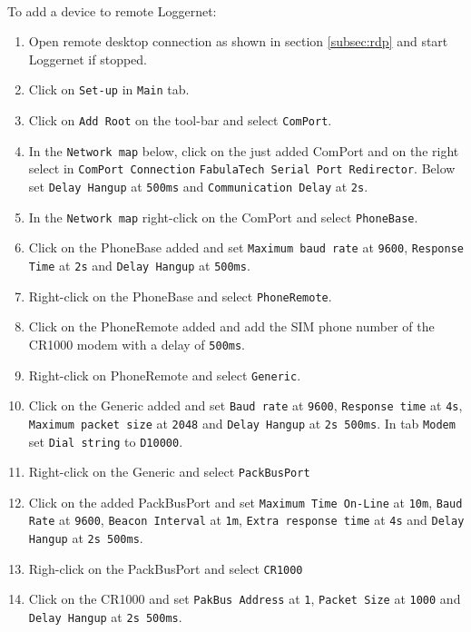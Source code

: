\paragraph{}
To add a device to remote Loggernet:
\begin{enumerate}
	\item Open remote desktop connection as shown in section \ref{subsec:rdp} and start Loggernet if stopped.
	\item Click on {\tt Set-up} in {\tt Main} tab.
	\item Click on {\tt Add Root} on the tool-bar and select {\tt ComPort}.
	\item In the {\tt Network map} below, click on the just added ComPort and on the right select in {\tt ComPort Connection} {\tt FabulaTech Serial Port Redirector}. Below set {\tt Delay Hangup} at {\tt 500ms} and {\tt Communication Delay} at {\tt 2s}.
	\item In the {\tt Network map} right-click on the ComPort and select {\tt PhoneBase}.
	\item Click on the PhoneBase added and set {\tt Maximum baud rate} at {\tt 9600}, {\tt Response Time} at {\tt 2s} and {\tt Delay Hangup} at {\tt 500ms}.
	\item Right-click on the PhoneBase and select {\tt PhoneRemote}.
	\item Click on the PhoneRemote added and add the SIM phone number of the CR1000 modem with a delay of {\tt 500ms}.
	\item Right-click on PhoneRemote and select {\tt Generic}.
	\item Click on the Generic added and set {\tt Baud rate} at {\tt 9600}, {\tt Response time} at {\tt 4s}, {\tt Maximum packet size} at {\tt 2048} and {\tt Delay Hangup} at {\tt 2s 500ms}. In tab {\tt Modem} set {\tt Dial string} to {\tt D10000}.
	\item Right-click on the Generic and select {\tt PackBusPort}
	\item Click on the added PackBusPort and set {\tt Maximum Time On-Line} at {\tt 10m}, {\tt Baud Rate} at {\tt 9600}, {\tt Beacon Interval} at {\tt 1m}, {\tt Extra response time} at {\tt 4s} and {\tt Delay Hangup} at {\tt 2s 500ms}.
	\item Righ-click on the PackBusPort and select {\tt CR1000}
	\item Click on the CR1000 and set {\tt PakBus Address} at {\tt 1}, {\tt Packet Size} at {\tt 1000} and {\tt Delay Hangup} at {\tt 2s 500ms}.
\end{enumerate}